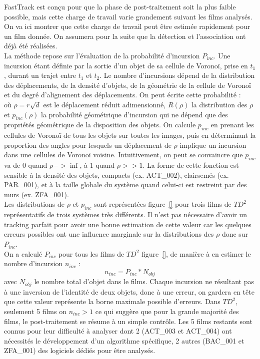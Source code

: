 	FastTrack est conçu pour que la phase de post-traitement soit la plus faible possible, mais cette charge de travail varie grandement suivant les films analysés. On va ici montrer que cette charge de travail peut être estimée rapidement pour un film donnée. On assumera pour la suite que la détection et l'association ont déjà été réalisées.\\
	
	La méthode repose sur l'évaluation de la probabilité d'incursion $P_{inc}$. Une incursion étant définie par la sortie d'un objet de sa cellule de Voronoï, prise en $t_1$, durant un trajet entre $t_1$ et $t_2$. Le nombre d'incursions dépend de la distribution des déplacements, de la densité d'objets, de la géométrie de la cellule de Voronoï et du degré d'alignement des déplacements. On peut écrite cette probabilité :
	$$$$
	où $\rho=r\sqrt{d}$ est le déplacement réduit adimensionné, $R(\rho)$ la distribution des $\rho$ et $p_{inc}(\rho)$ la probabilité géométrique d’incursion qui ne dépend que des propriétés géométrique de la disposition des objets. On calcule $p_{inc}$ en prenant les cellules de Voronoï de tous les objets sur toutes les images, puis en déterminant la proportion des angles pour lesquels un déplacement de $\rho$ implique un incursion dans une cellules de Voronoï voisine. Intuitivement, on peut se convaincre que $p_{inc}$ va de 0 quand $\rho->\inf$, à 1 quand $\rho>>1$. La forme de cette fonction est sensible à la densité des objets, compacts (ex. ACT\_002), clairsemés (ex. PAR\_001), et à la taille globale du système quand celui-ci est restreint par des murs (ex. ZFA\_001).\\
	
	Les distributions de $\rho$ et $p_{inc}$ sont représentées figure~\ref{} pour trois films de $TD^2$ représentatifs de trois systèmes très différents. Il n'est pas nécessaire d'avoir un tracking parfait pour avoir une bonne estimation de cette valeur car les quelques erreurs possibles ont une influence marginale sur la distributions des $\rho$ donc sur $P_{inc}$.\\
	On a calculé $P_{inc}$ pour tous les films de $TD^2$ figure~\ref{}, de manière à en estimer le nombre d'incursion $n_{inc}$ :
	$$
	    n_{inc}=P_{inc}*N_{obj}
	$$
	avec $N_{obj}$ le nombre total d'objet dans le films.
	Chaque incursion ne résultant pas à une inversion de l'identité de deux objets, donc à une erreur, on gardera en tête que cette valeur représente la borne maximale possible d'erreurs. Dans $TD^2$, seulement 5 films on $n_{inc}>1$ ce qui suggère que pour la grande majorité des films, le post-traitement se résume à un simple contrôle. Les 5 films restants sont connus pour leur difficulté à analyser dont 2 (ACT\_003 et ACT\_004) ont nécessités le développement d'un algorithme spécifique, 2 autres (BAC\_001 et ZFA\_001) des logiciels dédiés pour être analysés.
	
